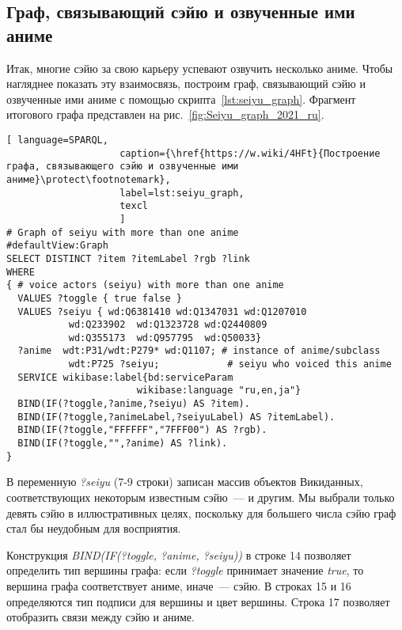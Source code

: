 \subsection{Граф, связывающий сэйю и озвученные ими аниме}

Итак, многие сэйю за свою карьеру успевают озвучить несколько аниме. Чтобы нагляднее показать эту взаимосвязь, построим граф, связывающий сэйю и озвученные ими аниме с помощью скрипта~\ref{lst:seiyu_graph}. Фрагмент итогового графа представлен на рис.~\ref{fig:Seiyu_graph_2021_ru}. 

\newpage

\lstset{numbers=left, firstnumber=1, frame=single}
\begin{lstlisting}[ language=SPARQL, 
                    caption={\href{https://w.wiki/4HFt}{Построение графа, связывающего сэйю и озвученные ими аниме}\protect\footnotemark},
                    label=lst:seiyu_graph,
                    texcl 
                    ]
# Graph of seiyu with more than one anime
#defaultView:Graph
SELECT DISTINCT ?item ?itemLabel ?rgb ?link
WHERE
{ # voice actors (seiyu) with more than one anime
  VALUES ?toggle { true false }
  VALUES ?seiyu { wd:Q6381410 wd:Q1347031 wd:Q1207010 
           wd:Q233902  wd:Q1323728 wd:Q2440809 
           wd:Q355173  wd:Q957795  wd:Q50033}
  ?anime  wdt:P31/wdt:P279* wd:Q1107; # instance of anime/subclass
           wdt:P725 ?seiyu;            # seiyu who voiced this anime 
  SERVICE wikibase:label{bd:serviceParam
					   wikibase:language "ru,en,ja"}
  BIND(IF(?toggle,?anime,?seiyu) AS ?item).
  BIND(IF(?toggle,?animeLabel,?seiyuLabel) AS ?itemLabel).
  BIND(IF(?toggle,"FFFFFF","7FFF00") AS ?rgb).
  BIND(IF(?toggle,"",?anime) AS ?link).
}
\end{lstlisting}%
\lstset{numbers=none}

В переменную \emph{?seiyu} (\num{7}-\num{9} строки) записан массив объектов Викиданных, соответствующих некоторым известным сэйю~---  и другим. Мы выбрали только девять сэйю в иллюстративных целях, поскольку для большего числа сэйю граф стал бы неудобным для восприятия.

Конструкция \emph{BIND(IF(?toggle, ?anime, ?seiyu))} в строке \num{14} позволяет определить тип вершины графа: если \emph{?toggle} принимает значение \emph{true}, то вершина графа соответствует аниме, иначе~--- сэйю. В строках \num{15} и \num{16} определяются тип подписи для вершины и цвет вершины. Строка \num{17} позволяет отобразить связи между сэйю и аниме.

